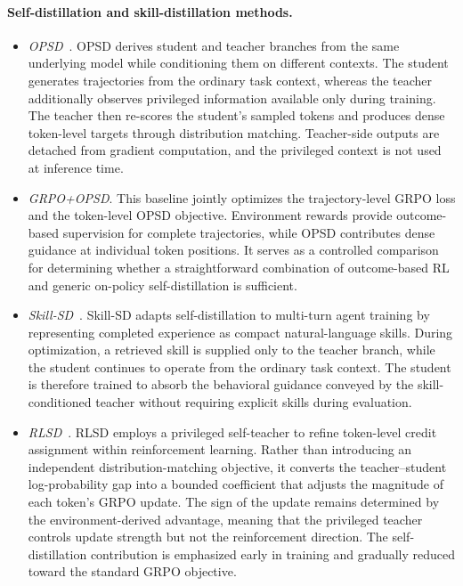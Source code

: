 \paragraph{Self-distillation and skill-distillation methods.}
\begin{itemize}
    \item \textit{OPSD}~\citep{zhao2026selfdistilledreasoner}.
    OPSD derives student and teacher branches from the same underlying model while conditioning them on different contexts.
    The student generates trajectories from the ordinary task context, whereas the teacher additionally observes privileged information available only during training.
    The teacher then re-scores the student's sampled tokens and produces dense token-level targets through distribution matching.
    Teacher-side outputs are detached from gradient computation, and the privileged context is not used at inference time.

    \item \textit{GRPO+OPSD}.
    This baseline jointly optimizes the trajectory-level GRPO loss and the token-level OPSD objective.
    Environment rewards provide outcome-based supervision for complete trajectories, while OPSD contributes dense guidance at individual token positions.
    It serves as a controlled comparison for determining whether a straightforward combination of outcome-based RL and generic on-policy self-distillation is sufficient.

    \item \textit{Skill-SD}~\citep{wang2026skillsd}.
    Skill-SD adapts self-distillation to multi-turn agent training by representing completed experience as compact natural-language skills.
    During optimization, a retrieved skill is supplied only to the teacher branch, while the student continues to operate from the ordinary task context.
    The student is therefore trained to absorb the behavioral guidance conveyed by the skill-conditioned teacher without requiring explicit skills during evaluation.

    \item \textit{RLSD}~\citep{yang2026rlsd}.
    RLSD employs a privileged self-teacher to refine token-level credit assignment within reinforcement learning.
    Rather than introducing an independent distribution-matching objective, it converts the teacher--student log-probability gap into a bounded coefficient that adjusts the magnitude of each token's GRPO update.
    The sign of the update remains determined by the environment-derived advantage, meaning that the privileged teacher controls update strength but not the reinforcement direction.
    The self-distillation contribution is emphasized early in training and gradually reduced toward the standard GRPO objective.


\end{itemize}
